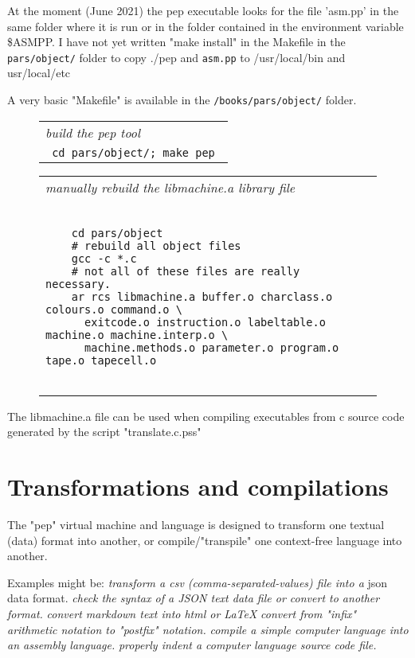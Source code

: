 \documentclass[a4paper,12pt]{article}
\begin{document}
  At the moment (June 2021) the pep executable looks for the file
  'asm.pp' in the same folder where it is run or in the folder contained
  in the environment variable \$ASMPP. I have not yet written "make install"
  in the Makefile in the \texttt{pars/object/} folder to copy ./pep and \texttt{asm.pp} to
  /usr/local/bin and usr/local/etc

  A very basic "Makefile" is available in the \texttt{/books/pars/object/}
  folder.
 \begin{figure}
 \begin{tabular}{ l }
 \emph{ build the pep tool } \\ 
 \verb| cd pars/object/; make pep |
 \end{tabular} 
 \end{figure}
 \begin{figure}
 \begin{tabular}{ l }
 \emph{ manually rebuild the libmachine.a library file  } \\ 
 \begin{lstlisting}[breaklines] 

    cd pars/object
    # rebuild all object files
    gcc -c *.c
    # not all of these files are really necessary. 
    ar rcs libmachine.a buffer.o charclass.o colours.o command.o \
      exitcode.o instruction.o labeltable.o machine.o machine.interp.o \
      machine.methods.o parameter.o program.o tape.o tapecell.o
  
 \end{lstlisting} 
 \end{tabular} 

 \end{figure}
  
  The libmachine.a file can be used when compiling executables from
  c source code generated by the script "translate.c.pss"

\section{Transformations and compilations}

  The "pep" virtual machine and language is designed to
  transform one textual (data) format into another, or compile/"transpile"
  one context-free language into another.

  Examples might be:
 \emph{ transform a csv (comma-separated-values) file into a  }
      json data format.
 \emph{ check the syntax of a JSON text data file or convert to another format. }
 \emph{ convert markdown text into html or LaTeX }
 \emph{ convert from "infix" arithmetic notation to "postfix" notation. }
 \emph{ compile a simple computer language into an assembly language. }
 \emph{ properly indent a computer language source code file. }
 
\end{document}
